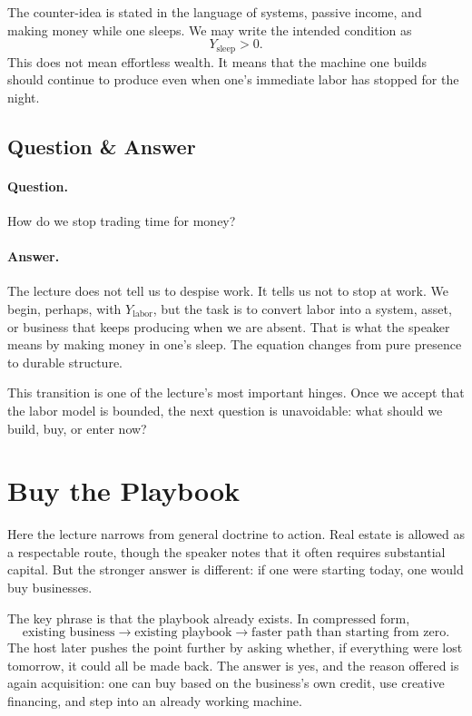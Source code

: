 The counter-idea is stated in the language of systems, passive income, and making money while one sleeps. We may write the intended condition as
\begin{equation}
Y_{\text{sleep}} > 0.
\end{equation}
This does not mean effortless wealth. It means that the machine one builds should continue to produce even when one's immediate labor has stopped for the night.

\subsection{Question \& Answer}

\paragraph{Question.} How do we stop trading time for money?

\paragraph{Answer.} The lecture does not tell us to despise work. It tells us not to stop at work. We begin, perhaps, with \(Y_{\text{labor}}\), but the task is to convert labor into a system, asset, or business that keeps producing when we are absent. That is what the speaker means by making money in one's sleep. The equation changes from pure presence to durable structure.

This transition is one of the lecture's most important hinges. Once we accept that the labor model is bounded, the next question is unavoidable: what should we build, buy, or enter now?

\section{Buy the Playbook}

Here the lecture narrows from general doctrine to action. Real estate is allowed as a respectable route, though the speaker notes that it often requires substantial capital. But the stronger answer is different: if one were starting today, one would buy businesses.

The key phrase is that the playbook already exists. In compressed form,
\begin{equation}
\text{existing business} \to \text{existing playbook} \to \text{faster path than starting from zero}.
\end{equation}
The host later pushes the point further by asking whether, if everything were lost tomorrow, it could all be made back. The answer is yes, and the reason offered is again acquisition: one can buy based on the business's own credit, use creative financing, and step into an already working machine.


